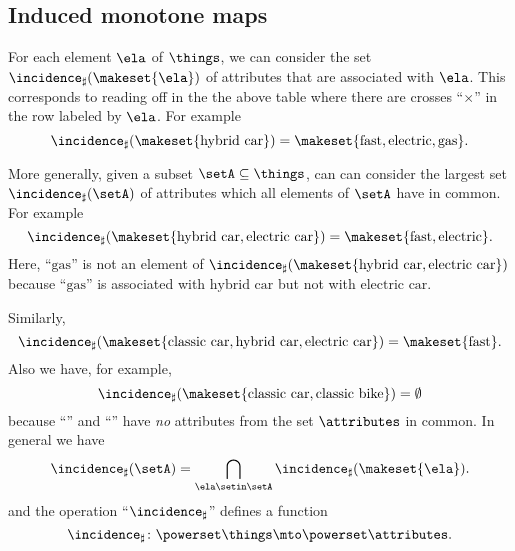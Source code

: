 \subsection{Induced monotone maps}

For each element $\ela$ of $\things$, we can consider the set $\incidence_\sharp(\makeset{\ela})$ of attributes that are associated with $\ela$. This corresponds to reading off in the the above table where there are crosses ``$\times$'' in the row labeled by $\ela$. For example
\begin{equation}\label{eq:fca-example-pushforward-1}
\incidence_\sharp(\makeset{\text{hybrid car}}) = \makeset{\text{fast}, \text{electric}, \text{gas}}. 
\end{equation}


More generally, given a subset $\setA \subseteq \things$, can can consider the largest set $\incidence_\sharp(\setA)$ of attributes which all elements of $\setA$ have in common. For example 
\begin{equation}\label{eq:fca-example-pushforward-2}
\incidence_\sharp(\makeset{\text{hybrid car}, \text{electric car}}) = \makeset{\text{fast}, \text{electric}}. 
\end{equation}
Here, ``$\text{gas}$'' is not an element of $\incidence_\sharp(\makeset{\text{hybrid car}, \text{electric car}})$ because ``$\text{gas}$'' is associated with $\text{hybrid car}$ but not with $\text{electric car}$.  

Similarly, 
\begin{equation}\label{eq:fca-example-pushforward-3}
\incidence_\sharp(\makeset{\text{classic car}, \text{hybrid car}, \text{electric car}}) = \makeset{\text{fast}}. 
\end{equation}
Also we have, for example, 
\begin{equation}\label{eq:fca-example-pushforward-4}
\incidence_\sharp(\makeset{\text{classic car}, \text{classic bike}}) = \emptyset
\end{equation}
because ``'' and ``'' have \emph{no} attributes from the set $\attributes$ in common. In general we have 
\begin{equation}\label{eq:fca-example-pushforward-5}
\incidence_\sharp(\setA) = \bigcap_{\ela \setin \setA} \incidence_\sharp(\makeset{\ela}).
\end{equation}
and the operation ``$\incidence_\sharp$'' defines a function 
\begin{equation}\label{eq:fca-example-pushforward-6}
\incidence_\sharp \colon \powerset \things \mto \powerset \attributes.
\end{equation}

